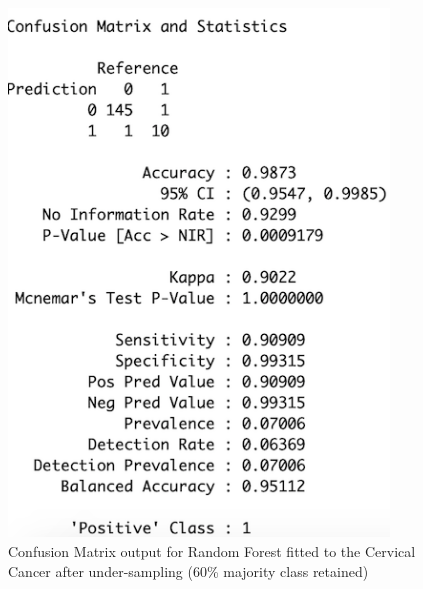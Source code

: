 \begin{figure}[!htbp]
    \centering
    \begin{minipage}{0.45\textwidth}
        \centering
        \includegraphics[width=0.9\textwidth]{ThesisTemplate/appendix/images/Chapter5Appendix/ConfusionMatrix60/CervicalCancer.png}
        \caption{Confusion Matrix output for Random Forest fitted to the Cervical Cancer after under-sampling (60\% majority class retained)}
        \label{fig:matrixCC60}
    \end{minipage}\hfill
    \begin{minipage}{0.45\textwidth}
        \centering

\end{minipage}
\end{figure}
